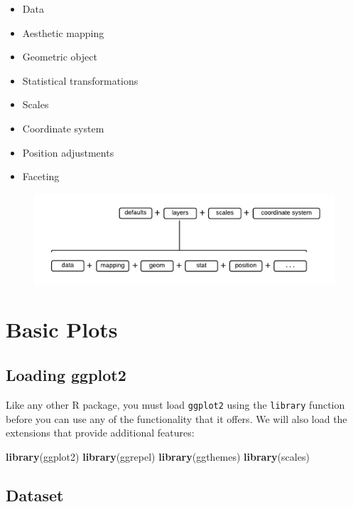 \documentclass[]{article}
\newenvironment{Shaded}{\begin{snugshade}}{\end{snugshade}}
\newcommand{\KeywordTok}[1]{\textcolor[rgb]{0.13,0.29,0.53}{\textbf{{#1}}}}
\newcommand{\NormalTok}[1]{{#1}}
\providecommand{\tightlist}{%
  \setlength{\itemsep}{0pt}\setlength{\parskip}{0pt}}
\theoremstyle{definition}
\theoremstyle{definition}
\theoremstyle{definition}
\theoremstyle{remark}
\begin{document}
\begin{itemize}
\tightlist
\item
  Data
\item
  Aesthetic mapping
\item
  Geometric object
\item
  Statistical transformations
\item
  Scales
\item
  Coordinate system
\item
  Position adjustments
\item
  Faceting
\end{itemize}

\begin{figure}[htbp]
\centering
\includegraphics{./img/ggplot2_blocks.png}
\caption{}
\end{figure}

\section{Basic Plots}\label{basic-plots}

\subsection{Loading ggplot2}\label{loading-ggplot2}

Like any other R package, you must load \texttt{ggplot2} using the
\texttt{library} function before you can use any of the functionality
that it offers. We will also load the extensions that provide additional
features:

\begin{Shaded}
\begin{Highlighting}[]
\KeywordTok{library}\NormalTok{(ggplot2)}
\KeywordTok{library}\NormalTok{(ggrepel)}
\KeywordTok{library}\NormalTok{(ggthemes)}
\KeywordTok{library}\NormalTok{(scales)}
\end{Highlighting}
\end{Shaded}

\subsection{Dataset}\label{dataset}
\end{document}
